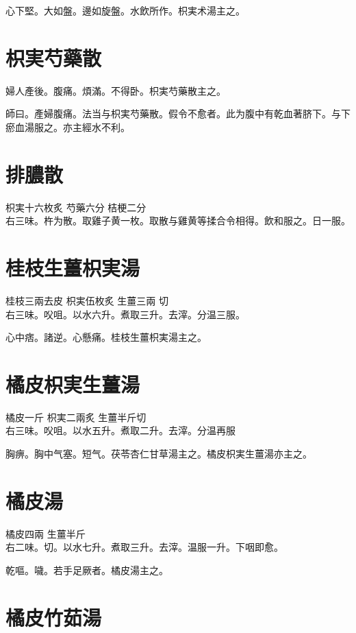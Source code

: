 心下堅。大如盤。邊如旋盤。水飲所作。枳{\khaaitp 実}术湯主之。

\section{枳実芍藥散}

{\khaaitp 婦人}產後。腹痛。煩滿。不得卧。枳実芍藥散主之。

師曰。產婦腹痛。法当与枳実芍藥散。假令不愈者。此为腹中有乾血著脐下。与下瘀血湯服之。{\khaaitp 亦}主經水不利。

\section{排膿散}

枳実{\scriptsize 十六枚炙} 芍藥{\scriptsize 六分} 桔梗{\scriptsize 二分}\\
右三味。杵为散。取雞子黄一枚。取散与雞黄等揉合令相得。飲和服之。日一服。

\section{桂枝生薑枳実湯}

桂枝{\scriptsize 三兩去皮} 枳実{\scriptsize 伍枚炙} 生薑{三兩 切}\\
右三味。㕮咀。以水六升。煮取三升。去滓。分温三服。

心中痞。諸逆。心懸痛。桂枝生薑枳実湯主之。

\section{橘{\khaaitp 皮}枳{\khaaitp 実生}薑湯}

橘皮{\scriptsize 一斤} 枳実{\scriptsize 二兩炙} 生薑{\scriptsize 半斤切}\\
右三味。㕮咀。以水五升。煮取二升。去滓。分温再服

胸痹。胸中气塞。短气。茯苓杏仁甘草湯主之。橘{\khaaitp 皮}枳{\khaaitp 実生}薑湯亦主之。

\section{橘皮湯}

橘皮{\scriptsize 四兩} 生薑{\scriptsize 半斤}\\
右二味。切。以水七升。煮取三升。去滓。温服一升。下咽即愈。

乾嘔。噦。若手足厥者。橘皮湯主之。

\section{橘皮竹茹湯}


